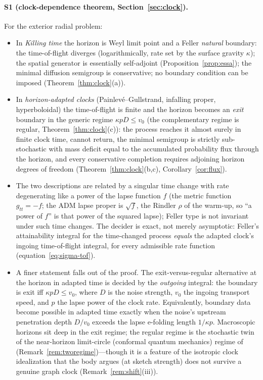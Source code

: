 \documentclass[11pt]{article}
\theoremstyle{definition}
\theoremstyle{remark}
\begin{document}
\paragraph{S1 (clock-dependence theorem, Section~\ref{sec:clock}).}
For the exterior radial problem:
\begin{itemize}
\item In \emph{Killing time} the horizon is Weyl limit point and a
Feller \emph{natural} boundary: the time-of-flight diverges
(logarithmically, rate set by the surface gravity $\kappa$); the
spatial generator is essentially self-adjoint
(Proposition~\ref{prop:essa}); the minimal diffusion semigroup is
conservative; no boundary condition can be imposed
(Theorem~\ref{thm:clock}(a)).
\item In \emph{horizon-adapted clocks} (Painlev\'e--Gullstrand,
infalling proper, hyperboloidal) the time-of-flight is finite and the
horizon becomes an \emph{exit} boundary in the generic regime
$\kappa pD\le v_{0}$ (the complementary regime is regular,
Theorem~\ref{thm:clock}(c)): the process reaches it almost
surely in finite clock time, cannot return, the minimal semigroup is
strictly sub-stochastic with mass deficit equal to the accumulated
probability flux through the horizon, and every conservative
completion requires adjoining horizon degrees of freedom
(Theorem~\ref{thm:clock}(b,c), Corollary~\ref{cor:flux}).
\item The two descriptions are related by a singular time change with
rate degenerating like a power of the lapse function $f$ (the metric
function $g_{tt}=-f$; the ADM lapse proper is $\sqrt f$, the Rindler
$\rho$ of the warm-up, so ``a power of $f$'' is that power of the squared
lapse); Feller type
is not invariant under such time changes. The decider is exact, not
merely asymptotic: Feller's attainability integral for the
time-changed process \emph{equals} the adapted clock's ingoing
time-of-flight integral, for every admissible rate function
(equation~\eqref{eq:sigma-tof}).
\item A finer statement falls out of the proof. The
exit-versus-regular alternative at the horizon in adapted time is
decided by the \emph{outgoing} integral: the boundary is exit iff
$\kappa p D \le v_{0}$, where $D$ is the noise strength, $v_{0}$ the
ingoing transport speed, and $p$ the lapse power of the clock rate.
Equivalently, boundary data become possible in adapted time exactly
when the noise's upstream penetration depth $D/v_{0}$ exceeds the
lapse e-folding length $1/\kappa p$. Macroscopic horizons sit deep in
the exit regime; the regular regime is the stochastic twin of the
near-horizon limit-circle (conformal quantum mechanics) regime of
\cite{GuptaSen2002,CamblongOrdonez2005,Balachandran2018}
(Remark~\ref{rem:tworegime})---though it is a feature of the isotropic
clock idealization that the body argues (at sketch strength) does not
survive a genuine graph clock (Remark~\ref{rem:shift}(iii)).
\end{itemize}
\end{document}
